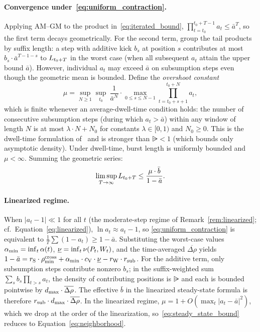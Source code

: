 \paragraph{Convergence under~\eqref{eq:uniform_contraction}.}
Applying AM--GM to the product in~\eqref{eq:iterated_bound},
$\prod_{t=t_0}^{t_0+T-1} a_t \leq \bar{a}^T$, so the first term decays
geometrically.  For the second term, group the tail products by
suffix length: a step with additive kick $b_s$ at position $s$
contributes at most $b_s \cdot \bar{a}^{T-1-s}$ to $L_{t_0+T}$ in
the worst case (when all subsequent $a_t$ attain the upper bound
$\bar{a}$).  However, individual $a_t$ may exceed $\bar{a}$ on
subsumption steps even though the geometric mean is bounded.  Define
the \emph{overshoot constant}
\begin{equation*}
\mu = \sup_{N \geq 1} \sup_{t_0}\ \frac{1}{\bar{a}^N} \cdot
  \max_{0 \leq s \leq N-1} \prod_{t=t_0+s+1}^{t_0+N} a_t,
\end{equation*}
which is finite whenever an average-dwell-time condition holds: the
number of consecutive subsumption steps (during which $a_t > \bar{a}$)
within any window of length $N$ is at most $\lambda \cdot N + N_0$ for
constants $\lambda \in [0,1)$ and $N_0 \geq 0$.  This is the dwell-time
formulation of~\citet[Ch.~2]{liberzon2003switching} and is stronger
than $\rsub < 1$ (which bounds only asymptotic density).  Under
dwell-time, burst length is uniformly bounded and $\mu < \infty$.
Summing the geometric series:
\begin{equation}
\label{eq:steady_state_bound}
\limsup_{T \to \infty} L_{t_0+T}
  \leq \frac{\mu \cdot \bar{b}}{1 - \bar{a}}.
\end{equation}

\paragraph{Linearized regime.}
When $|a_t - 1| \ll 1$ for all $t$ (the moderate-step regime of
Remark~\ref{rem:linearized}; cf.\ Equation~\ref{eq:linearized}),
$\ln a_t \approx a_t - 1$, so \eqref{eq:uniform_contraction} is
equivalent to $\frac{1}{T}\sum (1 - a_t) \geq 1 - \bar{a}$.
Substituting the worst-case values $\alpha_{\min} = \inf_t \alpha(t)$,
$\underline{\nu} = \inf_t \nu(P_t, W_t)$, and the time-averaged
$\overline{\Delta\rho}$ yields $1 - \bar{a} = r_{\mathrm{S}} \cdot \rho_{\min}^{\mathrm{cross}}
+ \alpha_{\min} \cdot c_{\mathrm{V}} \cdot \underline{\nu} - r_{\mathrm{W}} \cdot
r_{\mathrm{sub}}$.  For the additive term, only subsumption steps contribute
nonzero $b_s$; in the suffix-weighted sum
$\sum_s b_s \prod_{t>s} a_t$, the density of contributing positions
is $\rsub$ and each is bounded pointwise by
$d_{\mathrm{max}} \cdot \overline{\Delta\rho}$.  The effective $\bar{b}$ in the
linearized steady-state formula is therefore
$r_{\mathrm{sub}} \cdot d_{\mathrm{max}} \cdot \overline{\Delta\rho}$.  In the linearized
regime, $\mu = 1 + O(\max_t |a_t - \bar{a}|^2)$, which we drop at
the order of the linearization, so~\eqref{eq:steady_state_bound}
reduces to Equation~\ref{eq:neighborhood}.

